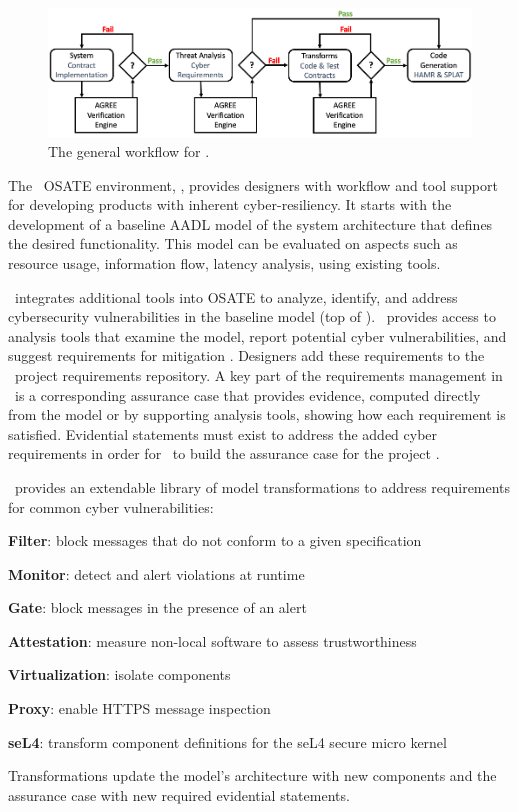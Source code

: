 \begin{figure}
	\begin{center}
	  \includegraphics[width=\textwidth]{./figs/workflow.png}
  	\end{center}
	\caption{The general workflow for \brfcs.}
	\label{fig:tool-arch}
\end{figure}

The \brfcs\ OSATE environment, , provides
designers with workflow and tool support for developing products with
inherent cyber-resiliency.  It starts with the development of a
baseline AADL model of the system architecture that defines the
desired functionality.  This model can be evaluated on aspects such as
resource usage, information flow, latency analysis, {\etc} using
existing tools.

\brfcs\ integrates additional tools into OSATE to analyze, identify,
and address cybersecurity vulnerabilities in the baseline model (top
of ).  \brfcs\ provides access to analysis tools
that examine the model, report potential cyber vulnerabilities, and
suggest requirements for mitigation \cite{dcrypps2019,gearcase2020}.
Designers add these requirements to the \brfcs\ project requirements
repository.  A key part of the requirements management in \brfcs\ is a
corresponding assurance case that provides evidence, computed directly
from the model or by supporting analysis tools, showing how each
requirement is satisfied.  Evidential statements must exist to address
the added cyber requirements in order for \brfcs\ to build the
assurance case for the project \cite{resolute-destion}.

\brfcs\ provides an extendable library of model transformations to address requirements for common cyber vulnerabilities:
\begin{compactitem}
	\item \textbf{Filter}: block messages that do not conform to a given specification
	\item \textbf{Monitor}: detect and alert violations at runtime
	\item \textbf{Gate}: block messages in the presence of an alert
	\item \textbf{Attestation}: measure non-local software to assess trustworthiness \cite{attestation-copland}
	\item \textbf{Virtualization}: isolate components
	\item \textbf{Proxy}: enable HTTPS message inspection
	\item \textbf{seL4}: transform component definitions for the seL4 secure micro kernel
\end{compactitem}
Transformations update the model's architecture with new components and the assurance case with new required evidential statements.

